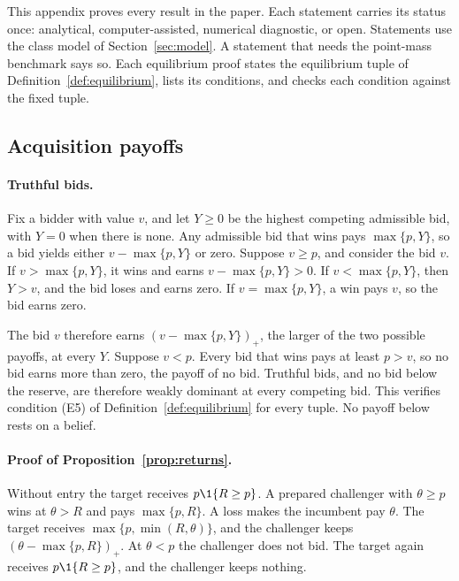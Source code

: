 This appendix proves every result in the paper. Each statement carries its status once: analytical,
computer-assisted, numerical diagnostic, or open. Statements use the class model of Section~\ref{sec:model}. A
statement that needs the point-mass benchmark says so. Each equilibrium proof states the equilibrium tuple of
Definition~\ref{def:equilibrium}, lists its conditions, and checks each condition against the fixed tuple.

\subsection{Acquisition payoffs}\label{app:payoffs}

\paragraph{Truthful bids.}
Fix a bidder with value \(v\), and let \(Y\ge0\) be the highest competing admissible bid, with \(Y=0\) when
there is none. Any admissible bid that wins pays \(\max\{p,Y\}\), so a bid yields either \(v-\max\{p,Y\}\) or
zero. Suppose \(v\ge p\), and consider the bid \(v\). If \(v>\max\{p,Y\}\), it wins and earns
\(v-\max\{p,Y\}>0\). If \(v<\max\{p,Y\}\), then \(Y>v\), and the bid loses and earns zero. If
\(v=\max\{p,Y\}\), a win pays \(v\), so the bid earns zero.

The bid \(v\) therefore earns \((v-\max\{p,Y\})_+\), the larger of the two possible payoffs, at every \(Y\).
Suppose \(v<p\). Every bid that wins pays at least \(p>v\), so no bid earns more than zero, the payoff of no
bid. Truthful bids, and no bid below the reserve, are therefore weakly dominant at every competing bid. This
verifies condition (E5) of Definition~\ref{def:equilibrium} for every tuple. No payoff below rests on a belief.

\paragraph{Proof of Proposition~\ref{prop:returns}.}
Without entry the target receives \(p\1\{R\ge p\}\). A prepared challenger with \(\theta\ge p\) wins at
\(\theta>R\) and pays \(\max\{p,R\}\). A loss makes the incumbent pay \(\theta\). The target receives
\(\max\{p,\min(R,\theta)\}\), and the challenger keeps \((\theta-\max\{p,R\})_+\). At \(\theta<p\) the
challenger does not bid. The target again receives \(p\1\{R\ge p\}\), and the challenger keeps nothing.

